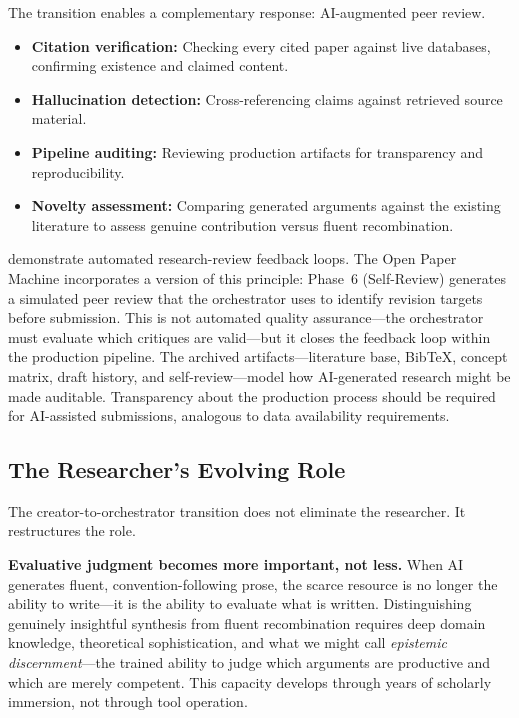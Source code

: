 \documentclass{article}
\begin{document}
The transition enables a complementary response: AI-augmented peer review.

\begin{itemize}
  \item \textbf{Citation verification:} Checking every cited paper against live databases, confirming existence and claimed content.
  \item \textbf{Hallucination detection:} Cross-referencing claims against retrieved source material.
  \item \textbf{Pipeline auditing:} Reviewing production artifacts for transparency and reproducibility.
  \item \textbf{Novelty assessment:} Comparing generated arguments against the existing literature to assess genuine contribution versus fluent recombination.
\end{itemize}

\citet{weng2024cycleresearcher} demonstrate automated research-review feedback loops. The Open Paper Machine incorporates a version of this principle: Phase~6 (Self-Review) generates a simulated peer review that the orchestrator uses to identify revision targets before submission. This is not automated quality assurance---the orchestrator must evaluate which critiques are valid---but it closes the feedback loop within the production pipeline. The archived artifacts---literature base, BibTeX, concept matrix, draft history, and self-review---model how AI-generated research might be made auditable. Transparency about the production process should be required for AI-assisted submissions, analogous to data availability requirements.

\subsection{The Researcher's Evolving Role}

The creator-to-orchestrator transition does not eliminate the researcher. It restructures the role.

\textbf{Evaluative judgment becomes more important, not less.} When AI generates fluent, convention-following prose, the scarce resource is no longer the ability to write---it is the ability to evaluate what is written. Distinguishing genuinely insightful synthesis from fluent recombination requires deep domain knowledge, theoretical sophistication, and what we might call \textit{epistemic discernment}---the trained ability to judge which arguments are productive and which are merely competent. This capacity develops through years of scholarly immersion, not through tool operation.
\end{document}
